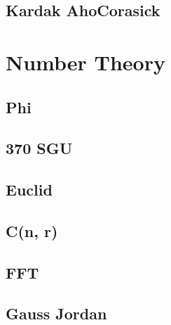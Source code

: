 \documentclass[a4paper,landscape]{article}
\begin{document}
\begin{multicols}{2}
\subsection{Kardak AhoCorasick}
	

\section{Number Theory}
\subsection{Phi}
	
\subsection{370 SGU}
	
\subsection{Euclid}
	
\subsection{C(n, r)}
	
\subsection{FFT}
	
\subsection{Gauss Jordan}
	


\end{multicols}
\end{document}
